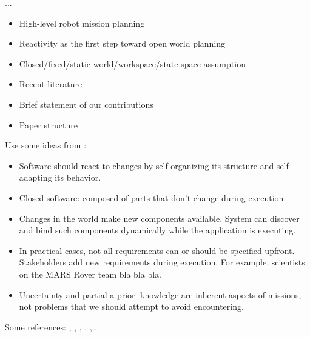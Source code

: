 ...

\begin{itemize}
	\item High-level robot mission planning
	\item Reactivity as the first step toward open world planning
  	\item Closed/fixed/static world/workspace/state-space assumption
 	\item Recent literature
   	\item Brief statement of our contributions
   	\item Paper structure
\end{itemize}

Use some ideas from \cite{open-world-sw}:
\begin{itemize}
	\item Software should react to changes by self-organizing its structure and self-adapting its behavior.
	\item Closed software: composed of parts that don't change during execution.
	\item Changes in the world make new components available. System can discover and bind such components dynamically while the application is executing.
	\item In practical cases, not all requirements can or should be specified upfront. Stakeholders add new requirements during execution. For example, scientists on the MARS Rover team bla bla bla.
	\item Uncertainty and partial a priori knowledge are inherent aspects of missions, not problems that we should attempt to avoid encountering.
\end{itemize}

Some references: \cite{MurrayICRA2012}, \cite{MurrayICRA2013a},  \cite{BeltaICRA2012}, \cite{Dimos2013ICRA}, \cite{Belta2013RSS}, \cite{BingxinRSS2012}.